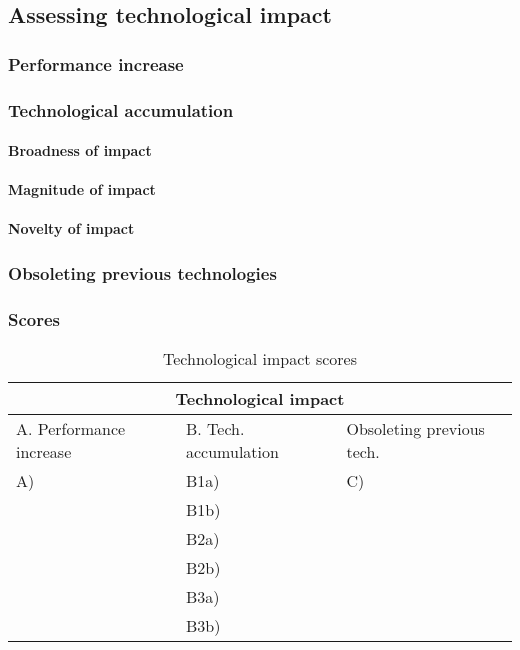 \subsection{Assessing technological impact}
\subsubsection{Performance increase}

\subsubsection{Technological accumulation}
\paragraph{Broadness of impact}

\paragraph{Magnitude of impact}

\paragraph{Novelty of impact}

\subsubsection{Obsoleting previous technologies}

\subsubsection{Scores}
\begin{table}[h]
\centering
\begin{tabular}{l l l}
\hline
\multicolumn{3}{|c|}{Technological impact} \\
\hline
A. Performance increase & B. Tech. accumulation & Obsoleting previous tech.\\
A) & B1a) & C)\\ 
   & B1b) & \\ 
   & B2a) & \\
   & B2b) & \\
   & B3a) & \\
   & B3b) & \\
\hline
\end{tabular}
\caption{Technological impact scores}
\label{tbl:impactscores3}
\end{table}